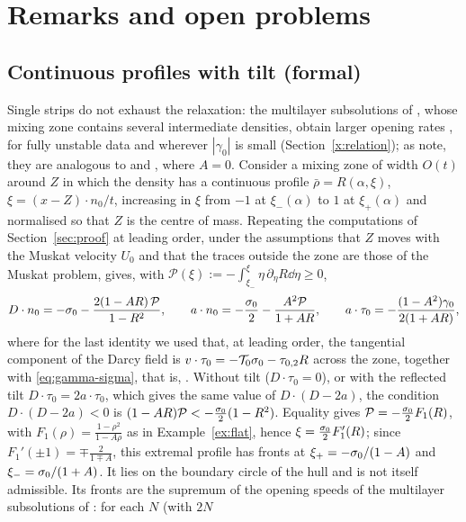 \section{Remarks and open problems}\label{sec:remarks}

\subsection{Continuous profiles with tilt (formal)}\label{x:profiles}
Single strips do not exhaust the relaxation: the multilayer subsolutions of \cite[Sec.~7.5]{LM26}, whose mixing zone contains several intermediate densities, obtain larger opening rates
\cite[Sec.~7]{LM26}, for fully unstable data and wherever $|\gamma_0|$ is small (Section~\ref{x:relation}); as \cite[Sec.~7.5]{LM26} note, they are analogous to \cite[Sec.~6.2]{CFM22}
and \cite[Sec.~5]{FS18}, where $A=0$. Consider a mixing zone of width $O(t)$ around $Z$ in which the density has a continuous profile
$\bar\rho=R(\alpha,\xi)$, $\xi=(x-Z)\cdot n_0/t$, increasing in $\xi$ from $-1$ at $\xi_-(\alpha)$ to $1$ at $\xi_+(\alpha)$ and normalised so that $Z$ is the centre of mass. Repeating the
computations of Section~\ref{sec:proof} at leading order, under the assumptions that $Z$ moves with the Muskat velocity $U_0$ and that the traces outside the zone are those of the Muskat problem,
gives, with $\mathcal P(\xi):=-\int_{\xi_-}^{\xi}\eta\,\partial_\eta R\dd\eta\ge0$,
\[
D\cdot n_0=-\sigma_0-\frac{2(1-AR)\,\mathcal P}{1-R^2},\qquad a\cdot n_0=-\frac{\sigma_0}{2}-\frac{A^2\mathcal P}{1+AR},\qquad a\cdot\tau_0=-\frac{(1-A^2)\gamma_0}{2(1+AR)},
\]
where for the last identity we used that, at leading order, the tangential component of the Darcy field is $v\cdot\tau_0=-\mathcal{T}_0\sigma_0-\tau_{0,2}R$ across the zone, together with
\eqref{eq:gamma-sigma}, that is, \cite[(3.7b)]{LM26}. Without tilt ($D\cdot\tau_0=0$), or with the reflected tilt $D\cdot\tau_0=2a\cdot\tau_0$, which gives the same value of $D\cdot(D-2a)$, the
condition $D\cdot(D-2a)<0$ is $(1-AR)\mathcal P<-\frac{\sigma_0}{2}(1-R^2)$. Equality gives $\mathcal P=-\frac{\sigma_0}2F_1(R)$, with $F_1(\rho)=\frac{1-\rho^2}{1-A\rho}$ as in
Example~\ref{ex:flat}, hence $\xi=\frac{\sigma_0}2F_1'(R)$; since $F_1'(\pm1)=\mp\frac2{1\mp A}$, this extremal profile has fronts at $\xi_+=-\sigma_0/(1-A)$ and $\xi_-=\sigma_0/(1+A)$. It lies on the
boundary circle of the hull and is not itself admissible. Its fronts are the supremum of the opening speeds of the multilayer subsolutions of \cite[Sec.~7.5]{LM26}: for each $N$ (with $2N$

